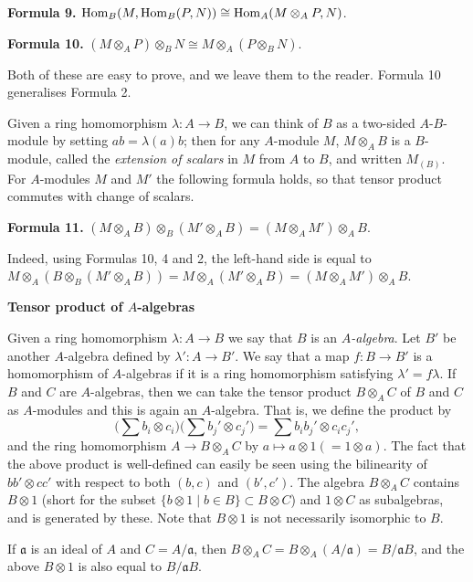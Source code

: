 \textbf{Formula 9.} $\operatorname{Hom}_B(M, \operatorname{Hom}_B(P, N)) \cong \operatorname{Hom}_A(M \otimes_A P, N)$.

\textbf{Formula 10.} $(M \otimes_A P) \otimes_B N \cong M \otimes_A (P \otimes_B N)$.

Both of these are easy to prove, and we leave them to the reader.
Formula 10 generalises Formula 2.

Given a ring homomorphism $\lambda\colon A \to B$, we can think of $B$ as a two-sided
$A$-$B$-module by setting $ab = \lambda(a)b$; then for any $A$-module $M$, $M \otimes_A B$ is a
$B$-module, called the \emph{extension of scalars} in $M$ from $A$ to $B$, and written
$M_{(B)}$. For $A$-modules $M$ and $M'$ the following formula holds, so that
tensor product commutes with change of scalars.

\textbf{Formula 11.} $(M \otimes_A B) \otimes_B (M' \otimes_A B) = (M \otimes_A M') \otimes_A B$.

Indeed, using Formulas 10, 4 and 2, the left-hand side is equal to
$M \otimes_A (B \otimes_B (M' \otimes_A B)) = M \otimes_A (M' \otimes_A B) = (M \otimes_A M') \otimes_A B$.

\medskip
\noindent\textbf{Tensor product of $A$-algebras}

Given a ring homomorphism $\lambda\colon A \to B$ we say that $B$ is an \emph{$A$-algebra}. Let
$B'$ be another $A$-algebra defined by $\lambda'\colon A \to B'$. We say that a map
$f\colon B \to B'$ is a homomorphism of $A$-algebras if it is a ring homomorphism
satisfying $\lambda' = f\lambda$. If $B$ and $C$ are $A$-algebras, then we can take the tensor
product $B \otimes_A C$ of $B$ and $C$ as $A$-modules and this is again an $A$-algebra.
That is, we define the product by
\[
  \Big(\sum b_i \otimes c_i\Big)\Big(\sum b_j' \otimes c_j'\Big) = \sum b_ib_j' \otimes c_ic_j',
\]
and the ring homomorphism $A \to B \otimes_A C$ by $a \mapsto a \otimes 1 (= 1 \otimes a)$. The
fact that the above product is well-defined can easily be seen using the
bilinearity of $bb' \otimes cc'$ with respect to both $(b, c)$ and $(b', c')$. The algebra
$B \otimes_A C$ contains $B \otimes 1$ (short for the subset $\{b \otimes 1 \mid b \in B\} \subset B \otimes C$)
and $1 \otimes C$ as subalgebras, and is generated by these. Note that $B \otimes 1$ is not
necessarily isomorphic to $B$.

\begin{example*}
If $\mathfrak{a}$ is an ideal of $A$ and $C = A/\mathfrak{a}$, then
$B \otimes_A C = B \otimes_A (A/\mathfrak{a}) = B/\mathfrak{a}B$, and the above $B \otimes 1$ is also equal to
$B/\mathfrak{a}B$.
\end{example*}

